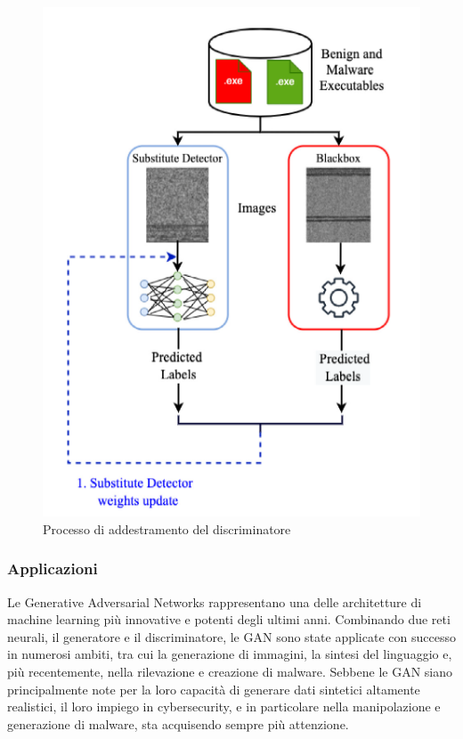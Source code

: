 \begin{figure}[ht]
    \centering
        \centering
        \includegraphics[width=0.6\linewidth]{images/discriminator_train.png}
        \caption{Processo di addestramento del discriminatore}
        \label{fig:discriminator_train}
\end{figure}




\subsubsection{Applicazioni}
Le Generative Adversarial Networks rappresentano una delle architetture di machine learning più innovative e potenti degli ultimi anni. Combinando due reti neurali, il generatore e il discriminatore, le GAN sono state applicate con successo in numerosi ambiti, tra cui la generazione di immagini, la sintesi del linguaggio e, più recentemente, nella rilevazione e creazione di malware. Sebbene le GAN siano principalmente note per la loro capacità di generare dati sintetici altamente realistici, il loro impiego in cybersecurity, e in particolare nella manipolazione e generazione di malware, sta acquisendo sempre più attenzione.

